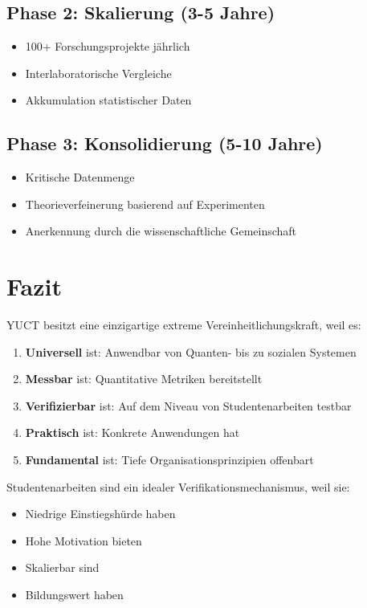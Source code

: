 \documentclass[12pt,a4paper]{article}
\begin{document}
	\subsection{Phase 2: Skalierung (3-5 Jahre)}
	\begin{itemize}
		\item 100+ Forschungsprojekte jährlich
		\item Interlaboratorische Vergleiche
		\item Akkumulation statistischer Daten
	\end{itemize}
	
	\subsection{Phase 3: Konsolidierung (5-10 Jahre)}
	\begin{itemize}
		\item Kritische Datenmenge
		\item Theorieverfeinerung basierend auf Experimenten
		\item Anerkennung durch die wissenschaftliche Gemeinschaft
	\end{itemize}
	
	\section{Fazit}
	
	YUCT besitzt eine einzigartige extreme Vereinheitlichungskraft, weil es:
	\begin{enumerate}
		\item \textbf{Universell} ist: Anwendbar von Quanten- bis zu sozialen Systemen
		\item \textbf{Messbar} ist: Quantitative Metriken bereitstellt
		\item \textbf{Verifizierbar} ist: Auf dem Niveau von Studentenarbeiten testbar
		\item \textbf{Praktisch} ist: Konkrete Anwendungen hat
		\item \textbf{Fundamental} ist: Tiefe Organisationsprinzipien offenbart
	\end{enumerate}
	
	Studentenarbeiten sind ein idealer Verifikationsmechanismus, weil sie:
	\begin{itemize}
		\item Niedrige Einstiegshürde haben
		\item Hohe Motivation bieten
		\item Skalierbar sind
		\item Bildungswert haben
	\end{itemize}
	
\end{document}
